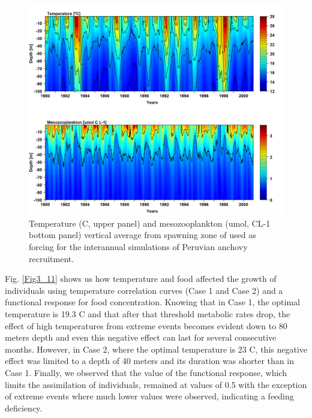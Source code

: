 \begin{figure}[ht]
	\includegraphics[width=1.0\textwidth]{figures/Fig3_10.png}
	\centering
	\caption{Temperature (\textdegree C, upper panel) and mesozooplankton (umol, CL-1 bottom panel) vertical average from spawning zone of used as forcing for the interannual simulations of Peruvian anchovy recruitment.}
	\label{Fig3_10}
\end{figure}

Fig. \ref{Fig3_11} shows us how temperature and food affected the growth of individuals using temperature correlation curves (Case 1 and Case 2) and a functional response for food concentration. Knowing that in Case 1, the optimal temperature is 19.3 \textdegree C and that after that threshold metabolic rates drop, the effect of high temperatures from extreme events becomes evident down to 80 meters depth and even this negative effect can last for several consecutive months. However, in Case 2, where the optimal temperature is 23 \textdegree C, this negative effect was limited to a depth of 40 meters and its duration was shorter than in Case 1. Finally, we observed that the value of the functional response, which limits the assimilation of individuals, remained at values of 0.5 with the exception of extreme events where much lower values were observed, indicating a feeding deficiency.\\

